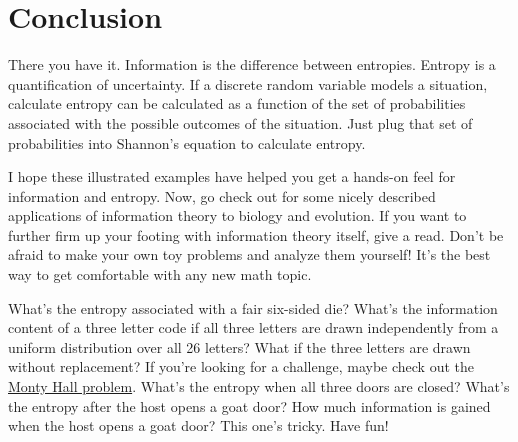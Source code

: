 \section{Conclusion}

There you have it.
Information is the difference between entropies.
Entropy is a quantification of uncertainty.
If a discrete random variable models a situation, calculate entropy can be calculated as a function of the set of probabilities associated with the possible outcomes of the situation.
Just plug that set of probabilities into Shannon's equation to calculate entropy.

I hope these illustrated examples have helped you get a hands-on feel for information and entropy.
Now, go check out \cite{Adami2012} for some nicely described applications of information theory to biology and evolution.
If you want to further firm up your footing with information theory itself, give \cite{Adami2016} a read.
Don't be afraid to make your own toy problems and analyze them yourself!
It's the best way to get comfortable with any new math topic.

What's the entropy associated with a fair six-sided die?
What's the information content of a three letter code if all three letters are drawn independently from a uniform distribution over all 26 letters?
What if the three letters are drawn without replacement?
If you're looking for a challenge, maybe check out the \href{https://en.wikipedia.org/wiki/Monty_Hall_problem}{Monty Hall problem}.
What's the entropy when all three doors are closed?
What's the entropy after the host opens a goat door?
How much information is gained when the host opens a goat door?
This one's tricky.
Have fun!
